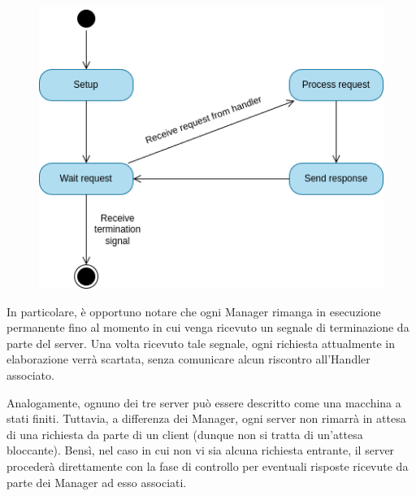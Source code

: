 \documentclass[12pt]{report}
\begin{document}
    \begin{figure}[H]
        \centering
        \includegraphics[scale=0.6]{images/Manager State Diagram.png}
        
        \label{fig:Manager_state_diagram}
    \end{figure}

    In particolare, è opportuno notare che ogni Manager rimanga in esecuzione permanente fino al momento in cui venga ricevuto un segnale di terminazione da parte del server. Una volta ricevuto tale segnale, ogni richiesta attualmente in elaborazione verrà scartata, senza comunicare alcun riscontro all'Handler associato.

    \newpage
    
    Analogamente, ognuno dei tre server può essere descritto come una macchina a stati finiti. Tuttavia, a differenza dei Manager, ogni server non rimarrà in attesa di una richiesta da parte di un client (dunque non si tratta di un'attesa bloccante). Bensì, nel caso in cui non vi sia alcuna richiesta entrante, il server procederà direttamente con la fase di controllo per eventuali risposte ricevute da parte dei Manager ad esso associati.
    
\end{document}
